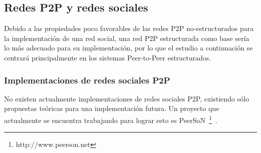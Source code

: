%
%
%
%
%
%



\subsection{Redes P2P y redes sociales}

Debido a las propiedades poco favorables de las redes P2P no-estructurados para la implementación de una red
social, una red P2P estructurada como base sería lo más adecuado para su
implementación, por lo que el estudio a continuación se centrará  principalmente
en los sistemas Peer-to-Peer estructurados.

\subsubsection{Implementaciones de redes sociales P2P}
No existen actualmente implementaciones de redes sociales P2P,
existiendo sólo propuestas teóricas para una implementación futura. Un proyecto
que actualmente se encuentra trabajando para lograr esto es
PeerSoN~\footnote{http://www.peerson.net}~\cite{buchegger:peerson, buchegger:2009:pps:1578002.1578010}.

